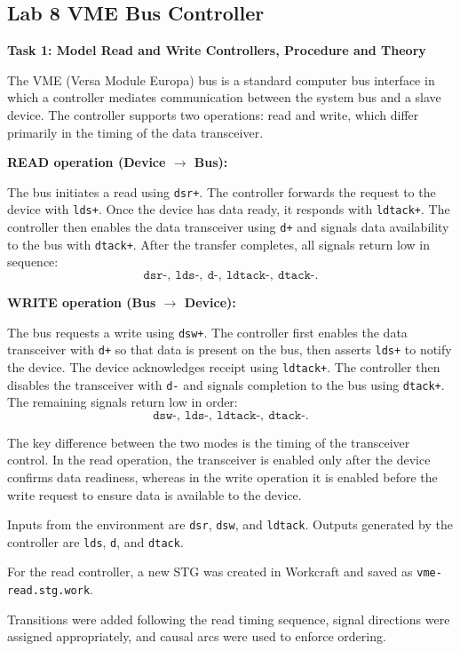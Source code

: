 \documentclass[a4paper,12pt]{article}
\begin{document}
\subsection{Lab 8 \- VME Bus Controller}

\textbf{Task 1: Model Read and Write Controllers, Procedure and Theory}

The VME (Versa Module Europa) bus is a standard computer bus interface in which a controller mediates communication between the system bus and a slave device. The controller supports two operations: read and write, which differ primarily in the timing of the data transceiver.

\textbf{READ operation (Device $\rightarrow$ Bus):}

The bus initiates a read using \texttt{dsr+}. The controller forwards the request to the device with \texttt{lds+}. Once the device has data ready, it responds with \texttt{ldtack+}. The controller then enables the data transceiver using \texttt{d+} and signals data availability to the bus with \texttt{dtack+}. After the transfer completes, all signals return low in sequence:
\[
\texttt{dsr-},\ \texttt{lds-},\ \texttt{d-},\ \texttt{ldtack-},\ \texttt{dtack-}.
\]

\textbf{WRITE operation (Bus $\rightarrow$ Device):}

The bus requests a write using \texttt{dsw+}. The controller first enables the data transceiver with \texttt{d+} so that data is present on the bus, then asserts \texttt{lds+} to notify the device. The device acknowledges receipt using \texttt{ldtack+}. The controller then disables the transceiver with \texttt{d-} and signals completion to the bus using \texttt{dtack+}. The remaining signals return low in order:
\[
\texttt{dsw-},\ \texttt{lds-},\ \texttt{ldtack-},\ \texttt{dtack-}.
\]

The key difference between the two modes is the timing of the transceiver control. In the read operation, the transceiver is enabled only after the device confirms data readiness, whereas in the write operation it is enabled before the write request to ensure data is available to the device.

Inputs from the environment are \texttt{dsr}, \texttt{dsw}, and \texttt{ldtack}. Outputs generated by the controller are \texttt{lds}, \texttt{d}, and \texttt{dtack}.

For the read controller, a new STG was created in Workcraft and saved as \texttt{vme-read.stg.work}. 

Transitions were added following the read timing sequence, signal directions were assigned appropriately, and causal arcs were used to enforce ordering. 
\end{document}
